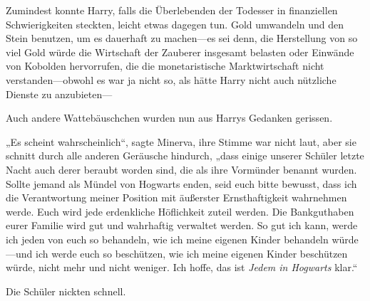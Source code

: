 Zumindest konnte Harry, falls die Überlebenden der Todesser in finanziellen Schwierigkeiten steckten, leicht etwas dagegen tun. Gold umwandeln und den Stein benutzen, um es dauerhaft zu machen—es sei denn, die Herstellung von so viel Gold würde die Wirtschaft der Zauberer insgesamt belasten oder Einwände von Kobolden hervorrufen, die die monetaristische Marktwirtschaft nicht verstanden—obwohl es war ja nicht so, als hätte Harry nicht auch nützliche Dienste zu anzubieten—

Auch andere Wattebäuschchen wurden nun aus Harrys Gedanken gerissen.

„Es scheint wahrscheinlich“, sagte Minerva, ihre Stimme war nicht laut, aber sie schnitt durch alle anderen Geräusche hindurch, „dass einige unserer Schüler letzte Nacht auch derer beraubt worden sind, die als ihre Vormünder benannt wurden.
Sollte jemand als Mündel von Hogwarts enden, seid euch bitte bewusst, dass ich die Verantwortung meiner Position mit äußerster Ernsthaftigkeit wahrnehmen werde.
Euch wird jede erdenkliche Höflichkeit zuteil werden. Die Bankguthaben eurer Familie wird gut und wahrhaftig verwaltet werden. So gut ich kann, werde ich jeden von euch so behandeln, wie ich meine eigenen Kinder behandeln würde—und ich werde euch so beschützen, wie ich meine eigenen Kinder beschützen würde, nicht mehr und nicht weniger. Ich hoffe, das ist \emph{Jedem in Hogwarts} klar.“

Die Schüler nickten schnell.

